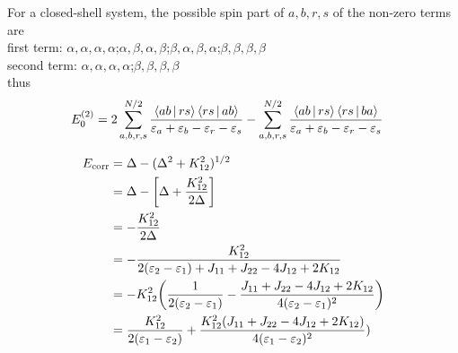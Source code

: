 \documentclass[a4paper]{article}
\begin{document}
For a closed-shell system, the possible spin part of $ a,b,r,s $ of the non-zero terms are\\
first term: $ \alpha,\alpha,\alpha,\alpha $;\quad $ \alpha,\beta,\alpha,\beta $;\quad $ \beta,\alpha,\beta,\alpha $;\quad $ \beta,\beta,\beta,\beta $\\
second term: $ \alpha,\alpha,\alpha,\alpha $;\quad $ \beta,\beta,\beta,\beta $\\
thus
\begin{align}
E_0^{(2)} &= 2\sum_{a,b,r,s}^{N/2}
\dfrac{\Braket{ab|rs}\Braket{rs|ab}}{\varepsilon_a + \varepsilon_b - \varepsilon_r - \varepsilon_s}
- \sum_{a,b,r,s}^{N/2}
\dfrac{\Braket{ab|rs}\Braket{rs|ba}}{\varepsilon_a + \varepsilon_b - \varepsilon_r - \varepsilon_s}
\end{align}

\begin{align}
E_{\operatorname{\mathrm{corr}}} &= \Delta - (\Delta^2 + K_{12}^2)^{1/2} \notag\\
&= \Delta - \qty[\Delta + \dfrac{K_{12}^2}{2\Delta}] \notag\\
&= - \dfrac{K_{12}^2}{2\Delta} \notag\\
&= - \dfrac{K_{12}^2}{2(\varepsilon_2-\varepsilon_1) + J_{11} + J_{22} - 4J_{12} + 2K_{12}} \notag\\
&= - K_{12}^2 \qty(\dfrac{1}{2(\varepsilon_2-\varepsilon_1)} - \dfrac{ J_{11} + J_{22} - 4J_{12} + 2K_{12}}{4(\varepsilon_2-\varepsilon_1)^2}) \notag\\
&= \dfrac{K_{12}^2}{2(\varepsilon_1-\varepsilon_2)} + \dfrac{K_{12}^2 (J_{11} + J_{22} - 4J_{12} + 2K_{12})}{4(\varepsilon_1-\varepsilon_2)^2})
\end{align}
\end{document}
